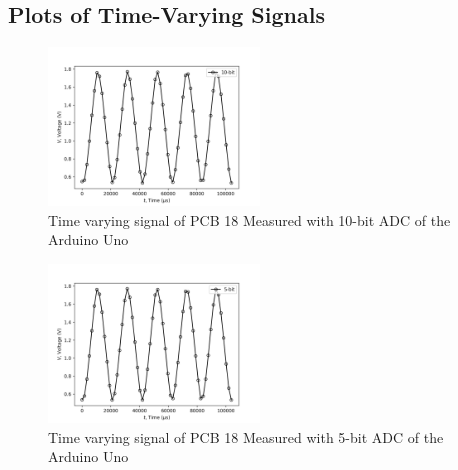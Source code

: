 \FloatBarrier


\subsection{Plots of Time-Varying Signals}
\begin{figure}[h]
    \centering
    \includegraphics[width=0.5\textwidth]{Sections/Figures/10bit.png}
    \caption{Time varying signal of PCB 18 Measured with 10-bit ADC of the Arduino Uno}
    \label{fig:10bit}
\end{figure}

\begin{figure}[h]
    \centering
    \includegraphics[width=0.5\textwidth]{Sections/Figures/5bit.png}
    \caption{Time varying signal of PCB 18 Measured with 5-bit ADC of the Arduino Uno}
    \label{fig:5bit}
\end{figure}
\FloatBarrier

\phantom{a}